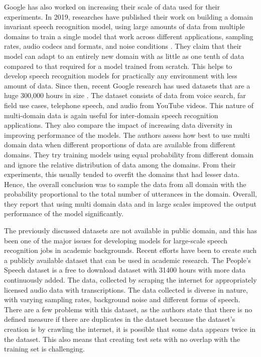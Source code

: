 Google has also worked on increasing their scale of data used for their experiments. In 2019, researches have published their work on building a domain invariant speech recognition model, using large amounts of data from multiple domains to train a single model that work across different applications, sampling rates, audio codecs and formats, and  noise conditions \cite{Narayanan2019TowardTraining}. They claim that their model can adapt to an entirely new domain with as little as one tenth of data compared to that required for a model trained from scratch. This helps to develop speech recognition models for practically any environment with less amount of data. Since then, recent Google research has used datasets that are a huge 300,000 hours in size \cite{Narayanan2019RECOGNIZINGMODELS}. The dataset consists of data from voice search, far field use cases, telephone speech, and audio from YouTube videos. This nature of multi-domain data is again useful for inter-domain speech recognition applications. They also compare the impact of increasing data diversity in improving performance of the models. The authors assess how best to use multi domain data when different proportions of data are available from different domains. They try training models using equal probability from different domain and ignore the relative distribution of data among the domains. From their experiments, this usually tended to overfit the domains that had lesser data. Hence, the overall conclusion was to sample the data from all domain with the probability proportional to the total number of utterances in the domain. Overall, they report that using multi domain data and in large scales improved the output performance of the model significantly.

The previously discussed datasets are not available in public domain, and this has been one of the major issues for developing models for large-scale speech recognition jobs in academic backgrounds. Recent efforts \cite{Galvez2021TheUsage, Pratap2020MLS:Research} have been to create such a publicly available dataset that can be used in academic research. The People's Speech dataset \cite{Galvez2021TheUsage} is a free to download dataset with 31400 hours with more data continuously added. The data, collected by scraping the internet for appropriately licensed audio data with transcriptions. The data collected is diverse in nature, with varying sampling rates, background noise and different forms of speech. There are a few problems with this dataset, as the authors state that there is no defined measure if there are duplicates in the dataset because the dataset's creation is by crawling the internet, it is possible that some data appears twice in the dataset. This also means that creating test sets with no overlap with the training set is challenging. 

